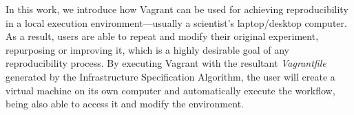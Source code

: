 In this work, we introduce how Vagrant can be used for achieving reproducibility in a local execution
environment---usually a scientist's laptop/desktop computer. As a result, users are able to repeat and 
modify their original experiment, repurposing or improving it, which is a highly desirable goal of any 
reproducibility process. By executing Vagrant with the resultant {\it Vagrantfile} generated by the Infrastructure Specification Algorithm, 
the user will create a virtual machine on its own computer and automatically execute the workflow, 
being also able to access it and modify the environment.




